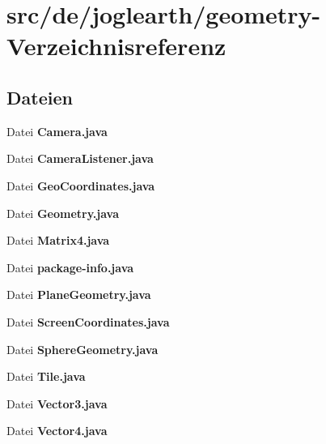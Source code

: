 \section{src/de/joglearth/geometry-\/\-Verzeichnisreferenz}
\label{dir_f4d18b2b374183a42d1af2d5d82ef0e9}
\subsection*{Dateien}
\begin{DoxyCompactItemize}
\item 
Datei {\bfseries Camera.\-java}
\item 
Datei {\bfseries Camera\-Listener.\-java}
\item 
Datei {\bfseries Geo\-Coordinates.\-java}
\item 
Datei {\bfseries Geometry.\-java}
\item 
Datei {\bfseries Matrix4.\-java}
\item 
Datei {\bfseries package-\/info.\-java}
\item 
Datei {\bfseries Plane\-Geometry.\-java}
\item 
Datei {\bfseries Screen\-Coordinates.\-java}
\item 
Datei {\bfseries Sphere\-Geometry.\-java}
\item 
Datei {\bfseries Tile.\-java}
\item 
Datei {\bfseries Vector3.\-java}
\item 
Datei {\bfseries Vector4.\-java}
\end{DoxyCompactItemize}
